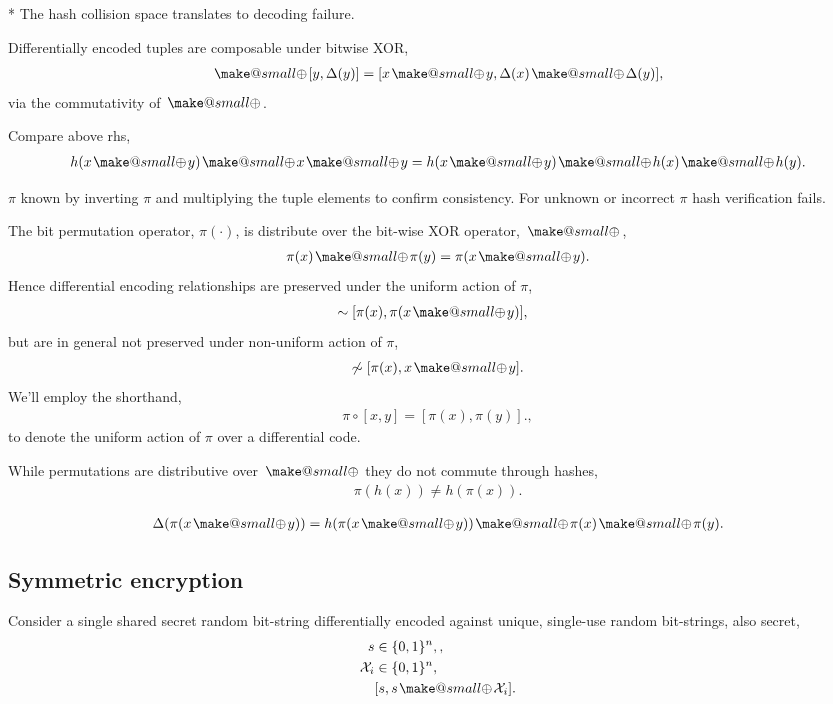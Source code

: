 \documentclass[twocolumn, aps, amsmath, amssymb, nofootinbib, superscriptaddress, longbibliography, doublefloatfix, table-of-contents, eqsecnum, rmp]{revtex4-2}
\makeatletter
\newcommand{\soplus}{{{\hspace{1pt}}{\mathbin{\mathpalette\make@small{\mathbin\oplus}}}}{\hspace{1pt}}}
\newcommand{\make@small}[2]{%
  \vcenter{\hbox{%
    \scalebox{0.6}{$\m@th#1#2$}%
  }}%
}
\makeatother
\begin{document}
* The hash collision space translates to decoding failure.

Differentially encoded tuples are composable under bitwise XOR,
\begin{align}
	[x,\Delta(x)] \soplus [y,\Delta(y)] = [x\soplus y, \Delta(x)\soplus \Delta(y)],
\end{align}
via the commutativity of $\soplus$.

Compare above rhs,
\begin{align}
	h(x\soplus y) \soplus x \soplus y = h(x \soplus y) \soplus h(x) \soplus h(y).
\end{align}

$\pi$ known by inverting $\pi$ and multiplying the tuple elements to confirm consistency. For unknown or incorrect $\pi$ hash verification fails.

The bit permutation operator, $\pi(\cdot)$, is distribute over the bit-wise XOR operator, $\soplus$,
\begin{align}
	\pi(x)\soplus \pi(y) = \pi(x\soplus y).
\end{align}
Hence differential encoding relationships are preserved under the uniform action of $\pi$,
\begin{align}
	[x,x\soplus y] &\sim [\pi(x), \pi(x\soplus y)],
\end{align}
but are in general not preserved under non-uniform action of $\pi$,
\begin{align}
	[x,x\soplus y] \not\sim [\pi(x), x\soplus y].
\end{align}
We'll employ the shorthand,
\begin{align}
	\pi\circ[x,y] = [\pi(x),\pi(y)].,
\end{align}
to denote the uniform action of $\pi$ over a differential code.

While permutations are distributive over $\soplus$ they do not commute through hashes,
\begin{align}
	\pi(h(x)) \neq h(\pi(x)).	
\end{align}

\begin{align}
	\Delta(\pi(x\soplus y)) = h(\pi(x\soplus y)) \soplus \pi(x) \soplus \pi(y).
\end{align}

\subsection{Symmetric encryption}

Consider a single shared secret random bit-string differentially encoded against unique, single-use random bit-strings, also secret,
\begin{align}
	s &\in \{0,1\}^n,,\nonumber\\
	\mathcal{X}_i &\in \{0,1\}^n,\nonumber\\
	&[s,s\soplus \mathcal{X}_i].
\end{align}
\end{document}
